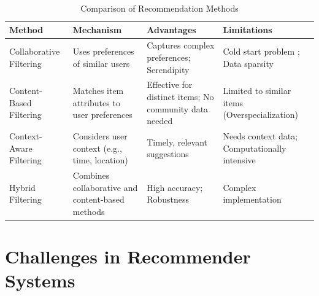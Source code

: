 \begin{table}[H]

\centering

\caption{Comparison of Recommendation Methods}

\label{tab:recommendation_techniques}

\renewcommand{\arraystretch}{1.3}

\begin{tabular}{|p{3.0cm}|p{4.2cm}|p{4.2cm}|p{3.6cm}|}

\hline

\textbf{Method} & \textbf{Mechanism} & \textbf{Advantages} & \textbf{Limitations} \\ \hline

Collaborative Filtering \cite{ref:rs_handbook} & Uses preferences of similar users & Captures complex preferences; Serendipity & Cold start problem \cite{ref:cold_start}; Data sparsity \cite{ref:matrix_factorization} \\ \hline

Content-Based Filtering \cite{sridhar2023content} & Matches item attributes to user preferences & Effective for distinct items; No community data needed & Limited to similar items (Overspecialization) \\ \hline

Context-Aware Filtering \cite{adomavicius2022context} & Considers user context (e.g., time, location) & Timely, relevant suggestions & Needs context data; Computationally intensive \\ \hline

Hybrid Filtering \cite{ref:hybrid_survey} & Combines collaborative and content-based methods & High accuracy; Robustness & Complex implementation \\ \hline

\end{tabular}

\end{table}




\section{Challenges in Recommender Systems}

\label{sec:challenges}



